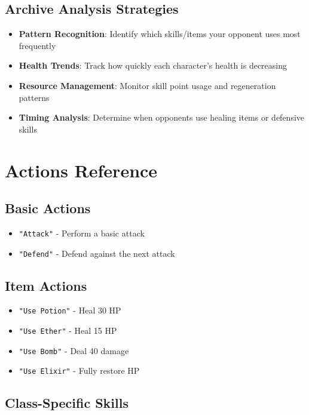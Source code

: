 \documentclass[12pt]{article}
\begin{document}
\subsection{Archive Analysis Strategies}
\begin{itemize}
    \item \textbf{Pattern Recognition}: Identify which skills/items your opponent uses most frequently
    \item \textbf{Health Trends}: Track how quickly each character's health is decreasing
    \item \textbf{Resource Management}: Monitor skill point usage and regeneration patterns
    \item \textbf{Timing Analysis}: Determine when opponents use healing items or defensive skills
\end{itemize}

\section{Actions Reference}
\label{sec:actions}

\subsection{Basic Actions}
\begin{itemize}
    \item \texttt{"Attack"} - Perform a basic attack
    \item \texttt{"Defend"} - Defend against the next attack
\end{itemize}

\subsection{Item Actions}
\begin{itemize}
    \item \texttt{"Use Potion"} - Heal 30 HP
    \item \texttt{"Use Ether"} - Heal 15 HP  
    \item \texttt{"Use Bomb"} - Deal 40 damage
    \item \texttt{"Use Elixir"} - Fully restore HP
\end{itemize}

\subsection{Class-Specific Skills}
\label{subsec:skills}
\end{document}
